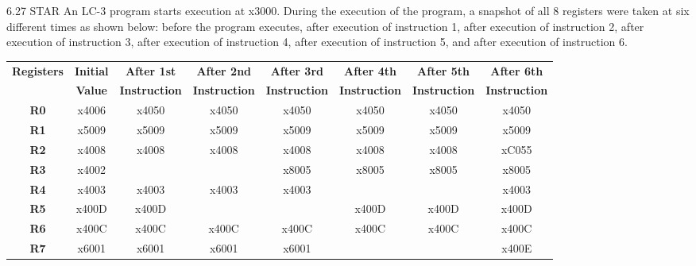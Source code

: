 \documentclass{patt}
\begin{document}
\begin{exercises}
\item[6.27]STAR An LC-3 program starts execution at x3000. During the execution of the
program, a snapshot of all 8 registers were taken at six different times as
shown below: before the program executes, after execution of instruction 1, after execution of
instruction 2, after execution of instruction 3, after execution of instruction
4, after execution of instruction 5, and after execution of instruction 6. 

\vspace{0.2in}

\begin{table}[h*]
\setlength{\tabcolsep}{0.6\tabcolsep}

\setlength{\extrarowheight}{0.08in}

\begin{tabular}{|c|c|c|c|c|c|c|c|} \hline
{\bf Registers} & {\bf Initial} & {\bf After 1st} & {\bf After 2nd} & {\bf After 3rd} & {\bf After 4th} &
{\bf After 5th} & {\bf After 6th} \\
          & {\bf Value}   & {\bf Instruction} & {\bf Instruction}  & {\bf Instruction} &
       {\bf Instruction} &
       {\bf Instruction} & {\bf Instruction} \\
\hline
{\bf R0} & x4006 & x4050 & x4050 & x4050 & x4050 & x4050 & x4050\\
\hline                                                                       
{\bf R1} & x5009 & x5009 & x5009 & x5009 & x5009 & x5009 & x5009\\
\hline                                                                       
{\bf R2} & x4008 & x4008 & x4008 & x4008 & x4008 & x4008 & xC055\\
\hline                                                                       
{\bf R3} & x4002 &       &       & x8005 & x8005 & x8005 & x8005\\
\hline                                                                       
{\bf R4} & x4003 & x4003 & x4003 & x4003 &       &       & x4003\\
\hline                                                                       
{\bf R5} & x400D & x400D &       &       & x400D & x400D & x400D\\
\hline                                                                       
{\bf R6} & x400C & x400C & x400C & x400C & x400C & x400C & x400C\\
\hline                                                                       
{\bf R7} & x6001 & x6001 & x6001 & x6001 &       &       & x400E\\
\hline
\end{tabular}
\end{table}
\vspace{0.2in}


\end{exercises}
\end{document}
